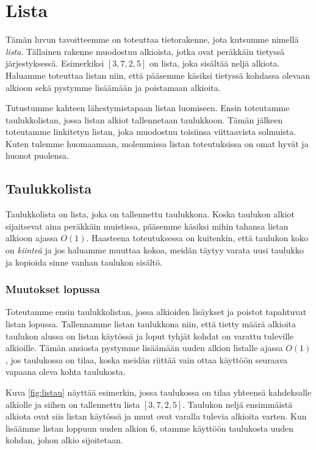 \chapter{Lista}

Tämän luvun tavoitteemme on toteuttaa tietorakenne,
jota kutsumme nimellä \emph{lista}.
Tällainen rakenne muodostuu alkioista,
jotka ovat peräkkäin tietyssä järjestyksessä.
Esimerkiksi $[3,7,2,5]$ on lista, joka sisältää
neljä alkiota.
Haluamme toteuttaa listan niin,
että pääsemme käsiksi tietyssä kohdassa olevaan alkioon
sekä pystymme lisäämään ja poistamaan alkioita.

Tutustumme kahteen lähestymistapaan listan luomiseen.
Ensin toteutamme taulukkolistan,
jossa listan alkiot tallennetaan taulukkoon.
Tämän jälkeen toteutamme linkitetyn listan,
joka muodostuu toisiinsa viittaavista solmuista.
Kuten tulemme huomaamaan, molemmissa listan toteutuksissa on omat
hyvät ja huonot puolensa.

\section{Taulukkolista}

Taulukkolista on lista, joka on tallennettu taulukkona.
Koska taulukon alkiot sijaitsevat aina peräkkäin muistissa,
pääsemme käsiksi mihin tahansa listan alkioon ajassa $O(1)$.
Haasteena toteutuksessa on kuitenkin,
että taulukon koko on \emph{kiinteä} ja jos haluamme
muuttaa kokoa, meidän täytyy varata uusi taulukko
ja kopioida sinne vanhan taulukon sisältö.

\subsection{Muutokset lopussa}

Toteutamme ensin taulukkolistan, jossa alkioiden
lisäykset ja poistot tapahtuvat listan lopussa.
Tallennamme listan taulukkona niin,
että tietty määrä alkioita taulukon alussa on listan käytössä
ja loput tyhjät kohdat on varattu tuleville alkioille.
Tämän ansiosta pystymme lisäämään uuden alkion listalle
ajassa $O(1)$, jos taulukossa on tilaa,
koska meidän riittää vain ottaa käyttöön seuraava
vapaana oleva kohta taulukosta.

Kuva \ref{fig:listau} näyttää esimerkin,
jossa taulukossa on tilaa yhteensä kahdeksalle alkiolle
ja siihen on tallennettu lista $[3,7,2,5]$.
Taulukon neljä ensimmäistä alkiota ovat siis listan käytössä
ja muut ovat varalla tulevia alkioita varten.
Kun lisäämme listan loppuun uuden alkion 6,
otamme käyttöön taulukosta uuden kohdan, johon alkio sijoitetaan.

